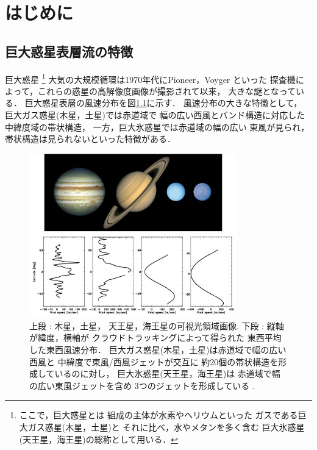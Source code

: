 \documentclass[a4j,12pt,openbib,oneside]{jreport}
\begin{document}
\clearpage
\setcounter{table}{0}
\setcounter{figure}{0}

\def\chap1{はじめに}
\chapter{\chap1}
\label{chap:1}
\markright{1 \chap1}
\def\intro1{巨大惑星表層流の特徴}
\section{\intro1}
\label{sec:intro1}
巨大惑星
%
\footnote{ここで，巨大惑星とは
組成の主体が水素やヘリウムといった
ガスである巨大ガス惑星(木星，土星)と
それに比べ，水やメタンを多く含む
巨大氷惑星(天王星，海王星)の総称として用いる．}
%
大気の大規模循環は1970年代にPioneer，Voyger といった
探査機によって，これらの惑星の高解像度画像が撮影されて以来，
大きな謎となっている．
%
巨大惑星表層の風速分布を図\ref{fig1}に示す\citep{showman2009atmospheric}．
%
風速分布の大きな特徴として，
巨大ガス惑星(木星，土星)では赤道域で
幅の広い西風とバンド構造に対応した中緯度域の帯状構造，
一方，巨大氷惑星では赤道域の幅の広い
東風が見られ，帯状構造は見られないといった特徴がある．
%
%
\begin{figure}[h]
  \begin{center}
    \includegraphics[clip,width=9cm]{./fig/intro/fig1.jpg}
    \caption{
      \footnotesize{上段 : 木星，土星，
天王星，海王星の可視光領域画像.
下段 : 縦軸が緯度，横軸が
クラウドトラッキングによって得られた
東西平均した東西風速分布．
巨大ガス惑星(木星，土星)は赤道域で幅の広い西風と
中緯度で東風/西風ジェットが交互に
約20個の帯状構造を形成しているのに対し，
巨大氷惑星(天王星，海王星)は
赤道域で幅の広い東風ジェットを含め
3つのジェットを形成している
\citep{showman2009atmospheric}.
      }
    }
    \label{fig1}
  \end{center}
\end{figure}
\end{document}
